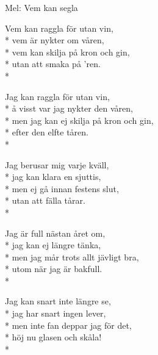 \begin{SongText}
    \begin{SongInfo}
        Mel: Vem kan segla
    \end{SongInfo}
    \begin{SongVerse}
        Vem kan raggla för utan vin,\\*%
        vem är nykter om våren,\\*%
        vem kan skilja på kron och gin,\\*%
        utan att smaka på 'ren.\\*%
    \end{SongVerse}
    \begin{SongVerse}
        Jag kan raggla för utan vin,\\*%
        å visst var jag nykter den våren,\\*%
        men jag kan ej skilja på kron och gin,\\*%
        efter den elfte tåren.\\*%
    \end{SongVerse}
    \begin{SongVerse}
        Jag berusar mig varje kväll,\\*%
        jag kan klara en sjuttis,\\*%
        men ej gå innan festens slut,\\*%
        utan att fälla tårar.\\*%
    \end{SongVerse}
    \begin{SongVerse}
        Jag är full nästan året om,\\*%
        jag kan ej längre tänka,\\*%
        men jag mår trots allt jävligt bra,\\*%
        utom när jag är bakfull.\\*%
    \end{SongVerse}
    \begin{SongVerse}
        Jag kan snart inte längre se,\\*%
        jag har snart ingen lever,\\*%
        men inte fan deppar jag för det,\\*%
        höj nu glasen och skåla!\\*%
    \end{SongVerse}
\end{SongText}
